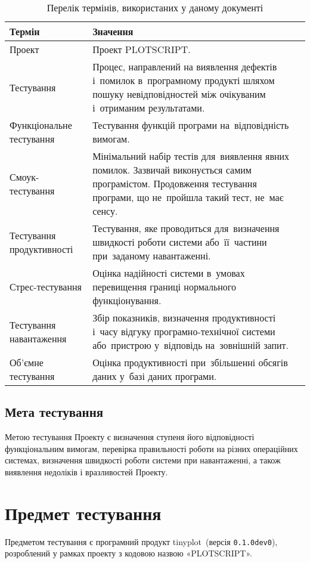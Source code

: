 \documentclass[a4paper,oneside,DIV=12,12pt]{scrartcl}
\newcommand{\progname}{tinyplot}
\newcommand{\theprojcode}{PLOTSCRIPT}
\begin{document}
			\begin{table}[!htbp]
			\centering
				\begin{tabular}{v{0.3\textwidth}v{0.6\textwidth}}
					\toprule
						Термін & Значення\\
					\midrule
						Проект                    & Проект \theprojcode.\\
						Тестування                & Процес, направлений на виявлення дефектів і~помилок в~програмному продукті шляхом пошуку невідповідностей між очікуваним і~отриманим результатами. \\
						Функціональне тестування  & Тестування функцій програми на~відповідність вимогам.\\
						Смоук-тестування          & Мінімальний набір тестів для~виявлення явних помилок. Зазвичай виконується самим програмістом. Продовження тестування програми, що не~пройшла такий тест, не~має сенсу.\\
						Тестування продуктивності & Тестування, яке проводиться для~визначення швидкості роботи системи або~її~частини при~заданому навантаженні.\\
						Стрес-тестування          & Оцінка надійності системи в~умовах перевищення границі нормального функціонування.\\
						Тестування навантаження   & Збір показників, визначення продуктивності і~часу відгуку програмно-технічної системи або~пристрою у~відповідь на~зовнішній запит. \\
						Об'ємне тестування        & Оцінка продуктивності при~збільшенні обсягів даних у~базі даних програми.\\
					\bottomrule
				\end{tabular}
			\caption{Перелік термінів, використаних у даному документі}
			\label{tab:definitions}
			\end{table}
			
		\subsection{Мета тестування}
			Метою тестування Проекту є визначення ступеня його відповідності функціональним вимогам, перевірка правильності роботи на різних операційних системах, визначення швидкості роботи системи при навантаженні, а також виявлення недоліків і вразливостей Проекту.
			
	\section{Предмет тестування}
		Предметом тестування є програмний продукт \progname~(версія \verb|0.1.0dev0|), розроблений у рамках проекту з кодовою назвою «\theprojcode».
		
\end{document}
